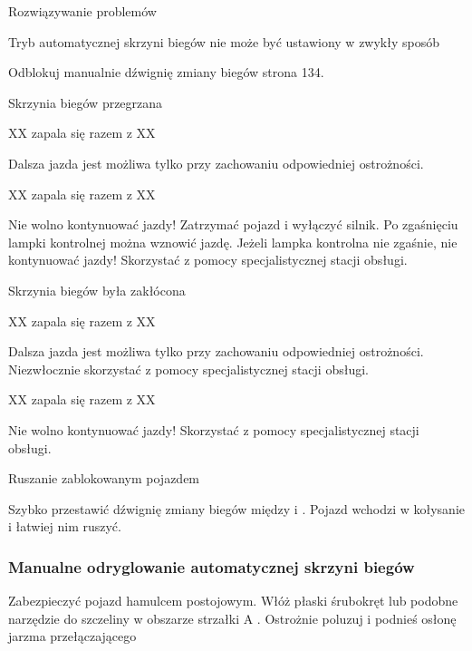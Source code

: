 Rozwiązywanie problemów

Tryb automatycznej skrzyni biegów nie może być ustawiony w zwykły sposób
\begin{itemizeArrow}
	\itemArrow Odblokuj manualnie dźwignię zmiany biegów \guillemotright strona 134.
\end{itemizeArrow}

Skrzynia biegów przegrzana

XX zapala się razem z XX

\begin{itemizeArrow}
	\itemArrow Dalsza jazda jest możliwa tylko przy zachowaniu odpowiedniej ostrożności.
\end{itemizeArrow}

XX zapala się razem z XX

\begin{itemizeArrow}
	\itemArrow Nie wolno kontynuować jazdy! Zatrzymać pojazd i wyłączyć silnik.
	\itemArrow Po zgaśnięciu lampki kontrolnej można wznowić jazdę.
	\itemArrow Jeżeli lampka kontrolna nie zgaśnie, nie kontynuować jazdy! Skorzystać z pomocy specjalistycznej stacji obsługi.
\end{itemizeArrow}

Skrzynia biegów była zakłócona

XX zapala się razem z XX

\begin{itemizeArrow}
	\itemArrow Dalsza jazda jest możliwa tylko przy zachowaniu odpowiedniej ostrożności.
	\itemArrow Niezwłocznie skorzystać z pomocy specjalistycznej stacji obsługi.
\end{itemizeArrow}

XX zapala się razem z XX

\begin{itemizeArrow}
	\itemArrow Nie wolno kontynuować jazdy! Skorzystać z pomocy specjalistycznej stacji obsługi.
\end{itemizeArrow}

Ruszanie zablokowanym pojazdem

Szybko przestawić dźwignię zmiany biegów między \gearDS i \gearR. Pojazd wchodzi w kołysanie i łatwiej nim ruszyć.

\subsubsection{Manualne odryglowanie automatycznej skrzyni biegów}


\begin{itemizeArrow}
	\itemArrow Zabezpieczyć pojazd hamulcem postojowym.
	\itemArrow Włóż płaski śrubokręt lub podobne narzędzie do szczeliny w obszarze strzałki A .
	\itemArrow Ostrożnie poluzuj i podnieś osłonę jarzma przełączającego
\end{itemizeArrow}

